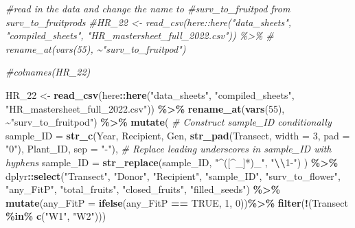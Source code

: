 \documentclass[
]{article}
\newenvironment{Shaded}{\begin{snugshade}}{\end{snugshade}}
\newcommand{\AttributeTok}[1]{\textcolor[rgb]{0.13,0.29,0.53}{#1}}
\newcommand{\CommentTok}[1]{\textcolor[rgb]{0.56,0.35,0.01}{\textit{#1}}}
\newcommand{\ConstantTok}[1]{\textcolor[rgb]{0.56,0.35,0.01}{#1}}
\newcommand{\DecValTok}[1]{\textcolor[rgb]{0.00,0.00,0.81}{#1}}
\newcommand{\FunctionTok}[1]{\textcolor[rgb]{0.13,0.29,0.53}{\textbf{#1}}}
\newcommand{\NormalTok}[1]{#1}
\newcommand{\OtherTok}[1]{\textcolor[rgb]{0.56,0.35,0.01}{#1}}
\newcommand{\SpecialCharTok}[1]{\textcolor[rgb]{0.81,0.36,0.00}{\textbf{#1}}}
\newcommand{\StringTok}[1]{\textcolor[rgb]{0.31,0.60,0.02}{#1}}
\begin{document}
\begin{Shaded}
\begin{Highlighting}[]
\CommentTok{\#read in the data and change the name to \#surv\_to\_fruitpod from surv\_to\_fruitprods}
\CommentTok{\#HR\_22 \textless{}{-} read\_csv(here::here("data\_sheets", "compiled\_sheets", "HR\_mastersheet\_full\_2022.csv")) \%\textgreater{}\%}
\CommentTok{\#  rename\_at(vars(55), \textasciitilde{}"surv\_to\_fruitpod")}
         
\CommentTok{\#colnames(HR\_22)}
      

\NormalTok{HR\_22 }\OtherTok{\textless{}{-}} \FunctionTok{read\_csv}\NormalTok{(here}\SpecialCharTok{::}\FunctionTok{here}\NormalTok{(}\StringTok{"data\_sheets"}\NormalTok{, }\StringTok{"compiled\_sheets"}\NormalTok{, }\StringTok{"HR\_mastersheet\_full\_2022.csv"}\NormalTok{)) }\SpecialCharTok{\%\textgreater{}\%}
  \FunctionTok{rename\_at}\NormalTok{(}\FunctionTok{vars}\NormalTok{(}\DecValTok{55}\NormalTok{), }\SpecialCharTok{\textasciitilde{}}\StringTok{"surv\_to\_fruitpod"}\NormalTok{) }\SpecialCharTok{\%\textgreater{}\%}
  \FunctionTok{mutate}\NormalTok{(}
    \CommentTok{\# Construct sample\_ID conditionally}
    \AttributeTok{sample\_ID =} \FunctionTok{str\_c}\NormalTok{(Year, Recipient, Gen, }\FunctionTok{str\_pad}\NormalTok{(Transect, }\AttributeTok{width =} \DecValTok{3}\NormalTok{, }\AttributeTok{pad =} \StringTok{"0"}\NormalTok{), Plant\_ID, }\AttributeTok{sep =} \StringTok{"{-}"}\NormalTok{),}
    \CommentTok{\# Replace leading underscores in sample\_ID with hyphens}
    \AttributeTok{sample\_ID =} \FunctionTok{str\_replace}\NormalTok{(sample\_ID, }\StringTok{"\^{}([\^{}\_]*)\_"}\NormalTok{, }\StringTok{"}\SpecialCharTok{\textbackslash{}\textbackslash{}}\StringTok{1{-}"}\NormalTok{)}
\NormalTok{  ) }\SpecialCharTok{\%\textgreater{}\%}
\NormalTok{  dplyr}\SpecialCharTok{::}\FunctionTok{select}\NormalTok{(}\StringTok{"Transect"}\NormalTok{, }\StringTok{"Donor"}\NormalTok{, }\StringTok{"Recipient"}\NormalTok{, }\StringTok{"sample\_ID"}\NormalTok{, }\StringTok{"surv\_to\_flower"}\NormalTok{, }\StringTok{"any\_FitP"}\NormalTok{, }\StringTok{"total\_fruits"}\NormalTok{, }\StringTok{"closed\_fruits"}\NormalTok{, }\StringTok{"filled\_seeds"}\NormalTok{) }\SpecialCharTok{\%\textgreater{}\%}
  \FunctionTok{mutate}\NormalTok{(}\AttributeTok{any\_FitP =} \FunctionTok{ifelse}\NormalTok{(any\_FitP }\SpecialCharTok{==} \ConstantTok{TRUE}\NormalTok{, }\DecValTok{1}\NormalTok{, }\DecValTok{0}\NormalTok{))}\SpecialCharTok{\%\textgreater{}\%}
  \FunctionTok{filter}\NormalTok{(}\SpecialCharTok{!}\NormalTok{(Transect }\SpecialCharTok{\%in\%} \FunctionTok{c}\NormalTok{(}\StringTok{"W1"}\NormalTok{, }\StringTok{"W2"}\NormalTok{)))}
\end{Highlighting}
\end{Shaded}
\end{document}
